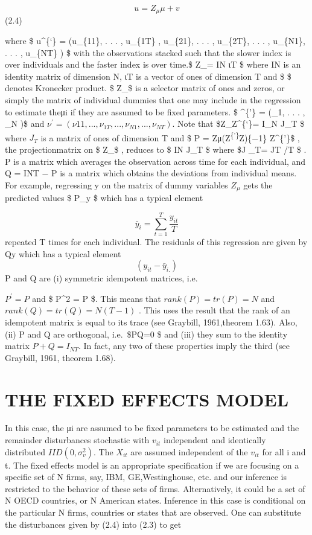 \documentclass[
]{book}
\begin{document}
\[ u=Z_\mu \mu  + v\] (2.4)

where \$ u\^{}\{`\} = (u\_\{11\}, . . . , u\_\{1T\} , u\_\{21\}, . . . , u\_\{2T\}, . . . , u\_\{N1\}, . . . , u\_\{NT\} ) \$ with the observations stacked such that the slower index is over individuals and the faster index is over time.\$ Z\_\mu = IN \otimes ιT \$ where IN is an identity matrix of dimension N, ιT is a vector of ones of dimension T and \$ \otimes \$ denotes Kronecker product. \$ Z\_\mu \$ is a selector matrix of ones and zeros, or simply the matrix of individual dummies that one may include in the regression to estimate theμi if they are assumed to be fixed parameters. \$ \mu\^{}\{'\} = (\mu\_1, . . . , \mu\_N )\$ and \(ν^{'} = (ν11, . . . , ν_{1T} , . . . , ν_{N1}, . . . , ν_{NT} )\). Note that \$Z\_\mu Z\^{}\{`\}\mu = I\_N \otimes J\_T \$ where \(J_T\) is a matrix of ones of dimension T and \$ P = Zμ(Z\textsuperscript{\{'\}}\mu Z\mu)\{−1\} Z\^{}\{'\}\mu \$ , the projectionmatrix on \$ Z\_\mu \$ , reduces to \$ IN \otimes J\_T \$ where \$J \_T= JT /T \$ . P is a matrix which averages the observation across time for each individual, and Q = INT − P is a matrix which obtains the deviations from individual means. For example, regressing y on the matrix of dummy variables \(Z_μ\) gets the predicted values \$ P\_y \$ which has a typical element

\[ \bar y_i = \sum_{t=1}^T \frac{y_{it}}{T}  \] repeated T times for each individual. The residuals of this regression are given by Qy which has a typical element \[ (y_{it} - \bar y _{i.} ) \] P and Q are (i) symmetric idempotent matrices, i.e.

\(P^{'} = P\) and \$ P\^{}2 = P \$. This means that \(rank(P) = tr(P) = N\) and \(rank(Q) = tr(Q) = N(T − 1)\) . This uses the result that the rank of an idempotent matrix is equal to its trace (see Graybill, 1961,theorem 1.63). Also, (ii) P and Q are orthogonal, i.e.~\$PQ=0 \$ and (iii) they sum to the identity matrix \(P + Q = I_{NT}\). In fact, any two of these properties imply the third (see Graybill, 1961, theorem 1.68).

\hypertarget{the-fixed-effects-model}{%
\section{THE FIXED EFFECTS MODEL}\label{the-fixed-effects-model}}

In this case, the μi are assumed to be fixed parameters to be estimated and the remainder disturbances stochastic with \(v_{it}\) independent and identically distributed \(IID(0,\sigma_v^2)\). The \(X_{it}\) are assumed independent of the \(v_{it}\) for all i and t. The fixed effects model is an appropriate specification if we are focusing on a specific set of N firms, say, IBM, GE,Westinghouse, etc. and our inference is restricted to the behavior of these sets of firms. Alternatively, it could be a set of N OECD countries, or N American states. Inference in this case is conditional on the particular N firms, countries or states that are observed. One can substitute the disturbances given by (2.4) into (2.3) to get
\end{document}
